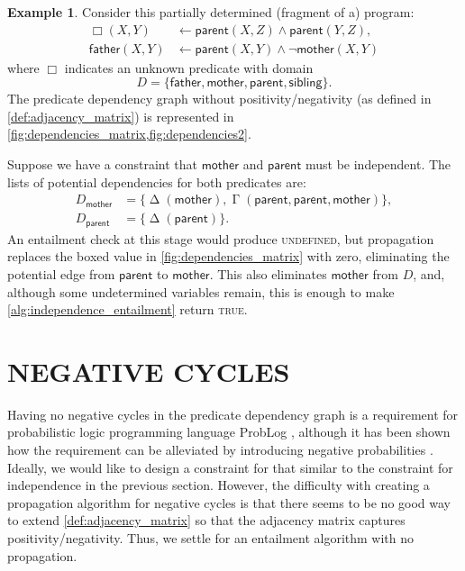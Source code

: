 \documentclass[letterpaper]{article}
\theoremstyle{definition}
\newtheorem{example}{Example}
\DeclareMathOperator{\Determined}{\Delta}
\DeclareMathOperator{\AlmostDetermined}{\Gamma}
\begin{document}
\begin{example} \label{example:independence}
  Consider this partially determined (fragment of a) program:
  \begin{align*}
    \Box(X, Y) &\gets \mathsf{parent}(X, Z) \land \mathsf{parent}(Y, Z),\\
    \mathsf{father}(X, Y) &\gets \mathsf{parent}(X, Y) \land \neg\mathsf{mother}(X, Y)
  \end{align*}
  where $\Box$ indicates an unknown predicate with domain
  \[
    D = \{ \mathsf{father}, \mathsf{mother}, \mathsf{parent}, \mathsf{sibling}
    \}.
  \]
  The predicate dependency graph without positivity/negativity (as defined in
  \cref{def:adjacency_matrix}) is represented in
  \cref{fig:dependencies_matrix,fig:dependencies2}.

  Suppose we have a constraint that $\mathsf{mother}$ and $\mathsf{parent}$ must
  be independent. The lists of potential dependencies for both predicates are:
  \begin{align*}
    D_{\mathsf{mother}} &= \{ \Determined(\mathsf{mother}), \AlmostDetermined(\mathsf{parent}, \mathsf{parent}, \mathsf{mother}) \}, \\
    D_{\mathsf{parent}} &= \{ \Determined(\mathsf{parent}) \}.
  \end{align*}
  An entailment check at this stage would produce \textsc{undefined}, but
  propagation replaces the boxed value in \cref{fig:dependencies_matrix} with
  zero, eliminating the potential edge from $\mathsf{parent}$ to
  $\mathsf{mother}$. This also eliminates $\mathsf{mother}$ from $D$, and,
  although some undetermined variables remain, this is enough to make
  \cref{alg:independence_entailment} return \textsc{true}.
\end{example}

\section{NEGATIVE CYCLES} \label{sec:cycles}

Having no negative cycles in the predicate dependency graph is a requirement for
probabilistic logic programming language ProbLog \citep{kimmig2009trading},
although it has been shown how the requirement can be alleviated by introducing
negative probabilities \citep{DBLP:journals/ijar/BuchmanP17}. Ideally, we would
like to design a constraint for that similar to the constraint for independence
in the previous section. However, the difficulty with creating a propagation
algorithm for negative cycles is that there seems to be no good way to extend
\cref{def:adjacency_matrix} so that the adjacency matrix captures
positivity/negativity. Thus, we settle for an entailment algorithm with no
propagation.
\end{document}
